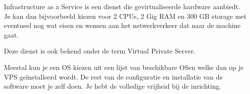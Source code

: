 Infrastructure as a Service is een dienst die gevirtualiseerde hardware aanbiedt. Je kan dan bijvoorbeeld kiezen voor 2 CPUs, 2 Gig RAM en 300 GB storage met eventueel nog wat eisen en wensen aan het netwerkverkeer dat naar de machine gaat.

Deze dienst is ook bekend onder de term Virtual Private Server.

Meestal kun je een OS kiezen uit een lijst van beschikbare OSen welke dan op je VPS ge\"installeerd wordt. De rest van de configuratie en installatie van de software moet je zelf doen. Je hebt de volledige vrijheid bij de inrichting.

